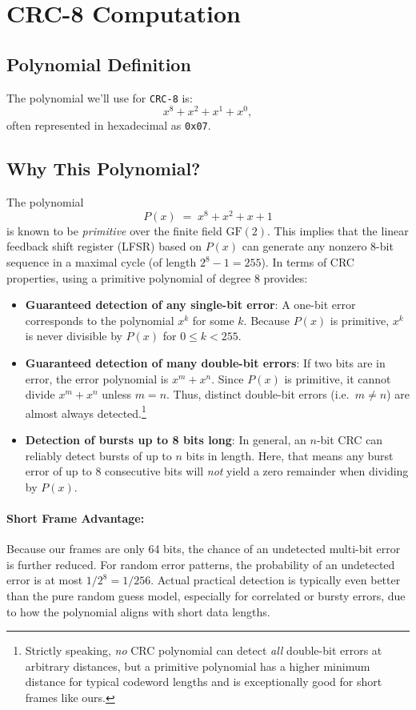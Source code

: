 \documentclass[a4paper,11pt]{article}
\begin{document}
\newpage
\section{CRC-8 Computation}

\subsection{Polynomial Definition}
The polynomial we'll use for \texttt{CRC-8} is:
\[
  x^8 + x^2 + x^1 + x^0,
\]
often represented in hexadecimal as \texttt{0x07}.

\subsection{Why This Polynomial?}
\label{sec:why_poly}

The polynomial
\[
P(x) \;=\; x^8 + x^2 + x + 1
\]
is known to be \emph{primitive} over the finite field \(\mathrm{GF}(2)\). This implies that the linear feedback shift register (LFSR) based on \(P(x)\) can generate any nonzero 8-bit sequence in a maximal cycle (of length \(2^8 - 1 = 255\)). In terms of CRC properties, using a primitive polynomial of degree 8 provides:

\begin{itemize}
  \item \textbf{Guaranteed detection of any single-bit error}: A one-bit error corresponds to the polynomial \(x^k\) for some \(k\). Because \(P(x)\) is primitive, \(x^k\) is never divisible by \(P(x)\) for \(0 \le k < 255\).
  \item \textbf{Guaranteed detection of many double-bit errors}: If two bits are in error, the error polynomial is \(x^m + x^n\). Since \(P(x)\) is primitive, it cannot divide \(x^m + x^n\) unless \(m=n\). Thus, distinct double-bit errors (i.e.\ \(m \neq n\)) are almost always detected.\footnote{Strictly speaking, \emph{no} CRC polynomial can detect \emph{all} double-bit errors at arbitrary distances, but a primitive polynomial has a higher minimum distance for typical codeword lengths and is exceptionally good for short frames like ours.}
  \item \textbf{Detection of bursts up to 8 bits long}: In general, an \(n\)-bit CRC can reliably detect bursts of up to \(n\) bits in length. Here, that means any burst error of up to 8 consecutive bits will \emph{not} yield a zero remainder when dividing by \(P(x)\).
\end{itemize}

\paragraph{Short Frame Advantage:}
Because our frames are only 64 bits, the chance of an undetected multi-bit error is further reduced. For random error patterns, the probability of an undetected error is at most \(1\!/\!2^8 = 1/256\). Actual practical detection is typically even better than the pure random guess model, especially for correlated or bursty errors, due to how the polynomial aligns with short data lengths.
\end{document}

